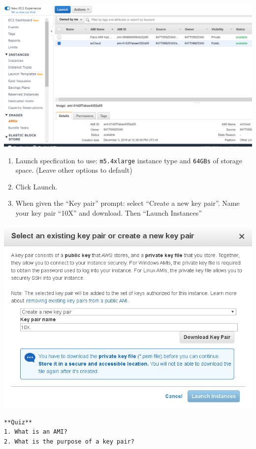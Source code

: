 \documentclass[]{book}
\begin{document}
\includegraphics[width=26.61in]{_book/10X_files/figure-html/AMI}

\begin{enumerate}
\def\labelenumi{\arabic{enumi}.}
\setcounter{enumi}{3}
\item
  Launch specfication to use: \texttt{m5.4xlarge} instance type and \texttt{64GBs} of storage space. (Leave other options to default)
\item
  Click Launch.
\item
  When given the ``Key pair'' prompt: select ``Create a new key pair''. Name your key pair ``10X'' and download. Then ``Launch Instances''
\end{enumerate}

\includegraphics[width=6.89in]{_book/10X_files/figure-html/key_pair}

\begin{verbatim}
**Quiz**
1. What is an AMI?
2. What is the purpose of a key pair?
\end{verbatim}
\end{document}
